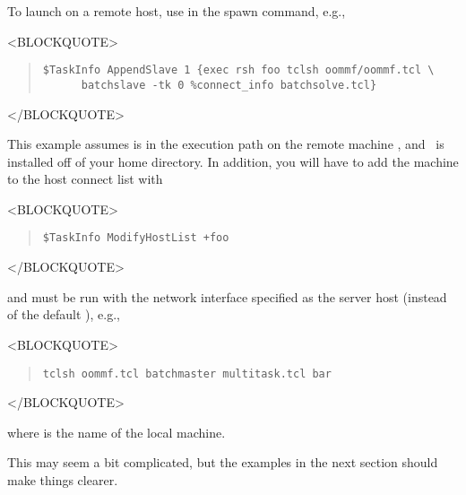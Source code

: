 To launch  on a remote host, use 
in the spawn command, e.g.,
\begin{rawhtml}<BLOCKQUOTE>\end{rawhtml}
\begin{quote}
\begin{verbatim}
$TaskInfo AppendSlave 1 {exec rsh foo tclsh oommf/oommf.tcl \
      batchslave -tk 0 %connect_info batchsolve.tcl}
\end{verbatim}
\end{quote}
\begin{rawhtml}</BLOCKQUOTE>\end{rawhtml}
This example assumes  is in the execution path on the remote
machine , and \OOMMF\ is installed off of your home directory.
In addition, you will have to add the machine \fn{foo} to the host
connect list with
\begin{rawhtml}<BLOCKQUOTE>\end{rawhtml}
\begin{quote}
\begin{verbatim}
$TaskInfo ModifyHostList +foo
\end{verbatim}
\end{quote}
\begin{rawhtml}</BLOCKQUOTE>\end{rawhtml}
and  must be run with the network interface specified
as the server host (instead of the default \fn{localhost}), e.g.,
\begin{rawhtml}<BLOCKQUOTE>\end{rawhtml}
\begin{quote}
\begin{verbatim}
tclsh oommf.tcl batchmaster multitask.tcl bar
\end{verbatim}
\end{quote}
\begin{rawhtml}</BLOCKQUOTE>\end{rawhtml}
where  is the name of the local machine.

This may seem a bit complicated, but the examples in the
next section should make things clearer.

